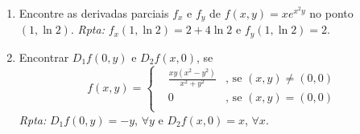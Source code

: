 \documentclass[11pt]{article}
\begin{document}
    \begin{enumerate}
    \item Encontre as derivadas parciais $f_{x}$ e $f_{y}$ de 
    $f(x,y)=xe^{x^{2}y}$ no ponto $(1,\ln 2)$.
    {\it Rpta:} $f_{x}(1,\ln 2)=2+4\ln 2$ e $f_{y}(1,\ln 2)=2$.    
    \item Encontrar $D_{1}f(0,y)$ e $D_{2}f(x,0)$, se 
        $$
    f(x,y)= \left\{  
            \begin{array}{lll}
    &\frac{xy(x^{2}-y^{2})}{x^{2}+y^2} &\text{, se } (x,y)\neq (0,0) \\
    & 0 &\text{, se } (x,y)=(0,0)  \\
            \end{array}
            \right. 
    $$
    {\it Rpta: } $D_{1}f(0,y)=-y$,  $\forall y$ e 
     $D_{2}f(x,0)=x$, $\forall x$.
    

\end{enumerate}
\end{document}
